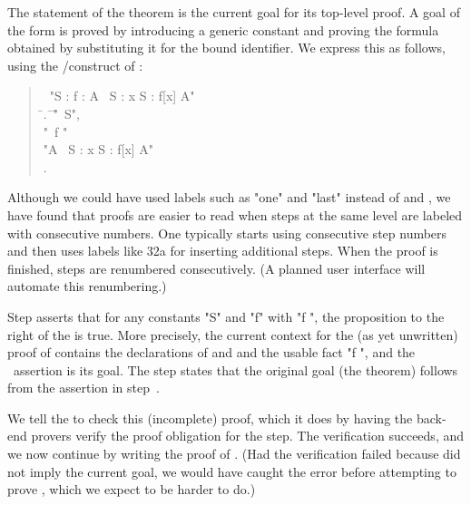 \documentclass[a4paper]{easychair}
\begin{document}
The statement of the theorem is the current goal for its top-level
proof. A goal of the form  is proved by introducing a
generic constant and proving the formula obtained by substituting it
for the bound identifier. We express this as follows, using the
\ASSUME/\PROVE construct of \tlatwo:
\begin{quote} \small
  \begin{tabbing}
    \THEOREM\ "\forall S : \forall f \in [S -> \SUBSET\ S] : 
                \exists A \in \SUBSET\ S : \forall x \in S : f[x] \neq A" \\
    \LSP \= .\ \= \ASSUME \= "\NEW\ S", \\
         \>        \>         \> "\NEW\ f \in [S -> \SUBSET\ S]"\\
         \>        \> \PROVE "\exists A \in \SUBSET\ S : \forall x \in S : f[x] \neq A" \\
         \> .  \> \QED \BY {}
  \end{tabbing}
\end{quote}
Although we could have used labels such as "one" and "last"
instead of  and , we have found that proofs are easier to read
when steps at the same level are labeled with consecutive numbers.
One typically starts using consecutive step numbers and then uses
labels like \s32a for inserting additional steps.  When the proof is
finished, steps are renumbered consecutively.  (A planned user
interface will automate this renumbering.)

Step  asserts that for any constants "S" and "f" with "f \in [S ->
\SUBSET\ S]", the proposition to the right of the \PROVE is true.
More precisely, the current context for the (as yet unwritten) proof
of  contains the declarations of  and  and the usable fact
"f \in [S -> \SUBSET\ S]", and the \PROVE\ assertion is its goal.  The
\QED step states that the original goal (the theorem) follows from the
assertion in step~.

We tell the \PM to check this (incomplete) proof, which it does by
having the back-end provers verify the proof obligation for the \QED
step.  The verification succeeds, and we now continue by writing the
proof of .  (Had the verification failed because  did not
imply the current goal, we would have caught the error before
attempting to prove , which we expect to be harder to do.)
\end{document}
